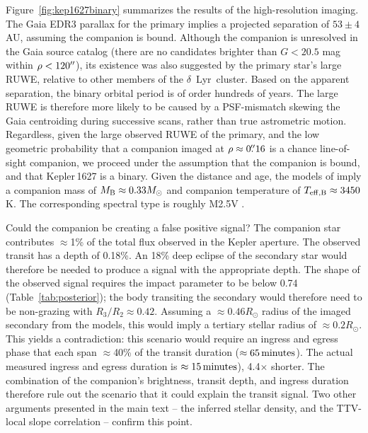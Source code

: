 \documentclass[12pt,modern,twocolumn,tighten]{aastex63}
\newcommand{\cn}{$\delta$\ Lyr\ cluster} %
\begin{document}
Figure~\ref{fig:kep1627binary} summarizes the results of the
high-resolution imaging.  The Gaia EDR3 parallax for the primary
implies a projected separation of $53 \pm 4$\,AU, assuming the
companion is bound.  Although the companion is unresolved in the Gaia
source catalog (there are no candidates brighter than $G < 20.5$ mag
within $\rho < 120\mbox{$^{\prime\prime}$}$), its existence was also suggested by the
primary star's large RUWE, relative to other members of the \cn.
Based on the apparent separation, the binary orbital period is of
order hundreds of years.  The large RUWE is therefore more likely to
be caused by a PSF-mismatch skewing the Gaia centroiding during
successive scans, rather than true astrometric motion.  Regardless,
given the large observed RUWE of the primary, and the low geometric
probability that a companion imaged at $\rho \approx 0\mbox{$.\!\!^{\prime\prime}$}16$ is a
chance line-of-sight companion, we proceed under the assumption that
the companion is bound, and that Kepler\,1627 is a binary.  Given the
distance and age, the models of \citet{baraffe_new_2015} imply a
companion mass of $M_{\rm B} \approx 0.33 M_{\odot}$ and companion
temperature of $T_{\rm eff,B} \approx 3450$ K.  The corresponding
spectral type is roughly M2.5V \citep{pecaut_mamajek_2013}.

Could the companion be creating a false positive signal?  The
companion star contributes $\approx$1\% of the total flux observed in
the Kepler aperture.  The observed transit has a depth of 0.18\%.  An
18\% deep eclipse of the secondary star would therefore be needed to
produce a signal with the appropriate depth.  The shape of the
observed signal requires the impact parameter to be below 0.74
(Table~\ref{tab:posterior}); the body transiting the secondary would
therefore need to be non-grazing with $R_3/R_2 \approx 0.42$.
Assuming a $\approx 0.46R_\odot$ radius of the imaged secondary
from the \citet{baraffe_new_2015} models, this
would imply a tertiary stellar radius of $\approx 0.2R_\odot$.  This
yields a contradiction:  this scenario would require an ingress and
egress phase that each span $\approx$40\% of the transit duration
($\approx 65\,{\rm minutes}$).  The actual measured ingress and egress
duration is $\approx 15\,{\rm minutes}$), 4.4$\times$ shorter.  The
combination of the companion's brightness, transit depth, and ingress
duration therefore rule out the scenario that it could explain the
transit signal.  Two other arguments presented in the main text -- the
inferred stellar density, and the TTV-local slope correlation --
confirm this point.
\end{document}
